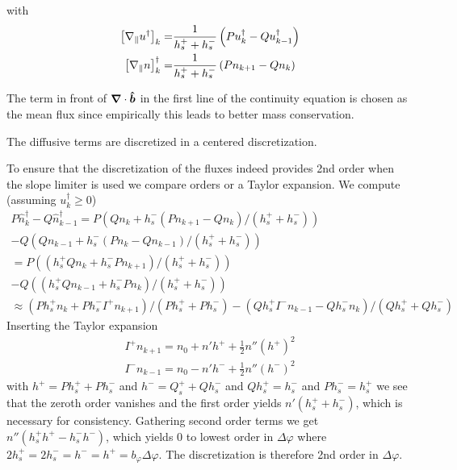 with
\begin{align}
\left[\nabla_\parallel u^\dagger \right]_k =& \frac{1}{h_s^+ + h_s^-}\left( P
u^\dagger_{k} - Q u^\dagger_{k-1}\right) \\
\left[\nabla_\parallel n\right]^\dagger_k =& \frac{1}{h_s^+ + h_s^-}\left( Pn_{k+1} -
Q n_k\right)
\end{align}
\begin{tcolorbox}[title=Note]
    The term in front of ${\boldsymbol{\nabla}}\cdot\bm{\hat{b}}$ in the first line of the continuity equation
    is chosen as the mean flux since empirically
    this leads to better mass conservation.
\end{tcolorbox}
\begin{tcolorbox}[title=Note]
    The diffusive terms are discretized in a centered discretization.
\end{tcolorbox}

To ensure that the discretization of the fluxes indeed provides 2nd order
when the slope limiter is used we compare orders or a Taylor expansion.
We compute
 (assuming $u_k^\dagger \geq 0$)
\begin{align*}
    P\hat n_k^\dagger - Q \hat n_{k-1}^\dagger =
    P(  Q n_k + h_s^- ( P n_{k+1} - Q n_k) / (h_s^+ + h_s^-) )
    \\
    - Q ( Q n_{k-1} + h_s^- (P n_k -Q n_{k-1})/(h_s^+ + h_s^-))
    \\
    =
    P((  h_s^+Q n_k + h_s^-  P n_{k+1}) / (h_s^+ + h_s^-))
   \\
    - Q (( h_s^+ Q n_{k-1} + h_s^- P n_k )/(h_s^+ + h_s^-))
    \\
    \approx \left( Ph_s^+ n_k + Ph_s^- I^+ n_{k+1}\right)/(Ph_s^+ + Ph_s^-) - \left(Qh_s^+ I^- n_{k-1} - Q h_s^- n_k\right)/(Qh_s^+ + Qh_s^-)
\end{align*}
Inserting the Taylor expansion
\begin{align}
I^+n_{k+1} = n_0 + n' h^+ + \frac{1}{2} n'' (h^+)^2 \\
I^-n_{k-1} = n_0 - n' h^- + \frac{1}{2} n'' (h^-)^2
\end{align}
with $h^+ = Ph_s^+ + P h_s^-$ and $h^- = Q_s^+ + Qh_s^-$ and $Qh_s^+ = h_s^-$ and $Ph_s^- = h_s^+$
we see that the zeroth order vanishes and the first order yields $n'(h_s^+ + h_s^-)$, which
is necessary for consistency. Gathering second order terms we get
$n'' (h_s^+ h^+ - h_s^- h^-)$, which yields $0$ to lowest order in $\Delta\varphi$
where $2h_s^+ = 2h_s^- = h^- = h^+ =  b_\varphi \Delta \varphi $.
The discretization is therefore 2nd order in $\Delta\varphi$.


